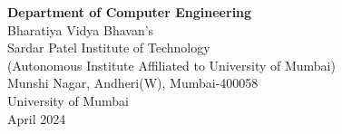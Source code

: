 \begin{center}
\textbf {Department of Computer Engineering}\\
Bharatiya  Vidya Bhavan's\\
Sardar Patel Institute of Technology\\
(Autonomous Institute Affiliated to University of Mumbai)\\
Munshi Nagar, Andheri(W), Mumbai-400058\\
University of Mumbai\\
April 2024\\
\end{center}

